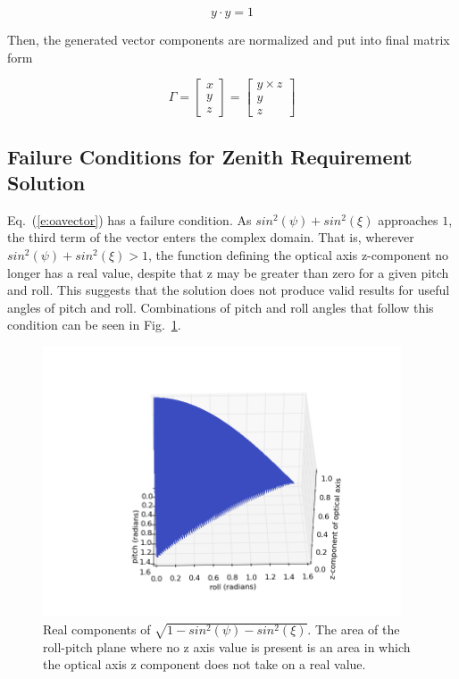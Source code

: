 \documentclass[12pt,a4paper]{book}
\begin{document}
\begin{equation}
y \cdot y = 1
\end{equation}

Then, the generated vector components are normalized and put into final matrix form

\begin{equation}
\Gamma = \begin{bmatrix}
x\\
y\\
z
\end{bmatrix} = \begin{bmatrix}
y\times z \\
y\\
z
\end{bmatrix}
\end{equation}
\subsection{Failure Conditions for Zenith Requirement Solution}
Eq.~(\ref{e:oavector}) has a failure condition.  As $sin^{2}(\psi)+sin^{2}(\xi)$ approaches $1$, the third term of the vector enters the complex domain.  That is, wherever $sin^{2}(\psi)+sin^{2}(\xi)>1$, the function defining the optical axis z-component no longer has a real value, despite that z may be greater than zero for a given pitch and roll. This suggests that the solution does not produce valid results for useful angles of pitch and roll. Combinations of pitch and roll angles that follow this condition can be seen in Fig.~\ref{f:failure}.
\begin{figure}[!ht]
\centering
\includegraphics[height=8cm]{zenithFail.png}
\caption{Real components of $\sqrt{1-sin^{2}(\psi)-sin^{2}(\xi)}$.  The area of the roll-pitch plane where no z axis value is present is an area in which the optical axis z component does not take on a real value.}
\label{f:failure}
\end{figure}
\end{document}
